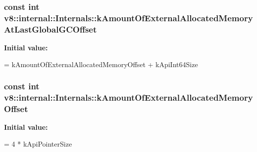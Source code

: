 \subsubsection[{\texorpdfstring{k\+Amount\+Of\+External\+Allocated\+Memory\+At\+Last\+Global\+G\+C\+Offset}{kAmountOfExternalAllocatedMemoryAtLastGlobalGCOffset}}]{\setlength{\rightskip}{0pt plus 5cm}const int v8\+::internal\+::\+Internals\+::k\+Amount\+Of\+External\+Allocated\+Memory\+At\+Last\+Global\+G\+C\+Offset\hspace{0.3cm}{\ttfamily [static]}}\hypertarget{classv8_1_1internal_1_1Internals_a4839a352b8fc929d6f05028abe0db272}{}\label{classv8_1_1internal_1_1Internals_a4839a352b8fc929d6f05028abe0db272}
{\bfseries Initial value\+:}
\begin{DoxyCode}
=
      kAmountOfExternalAllocatedMemoryOffset + kApiInt64Size
\end{DoxyCode}
\subsubsection[{\texorpdfstring{k\+Amount\+Of\+External\+Allocated\+Memory\+Offset}{kAmountOfExternalAllocatedMemoryOffset}}]{\setlength{\rightskip}{0pt plus 5cm}const int v8\+::internal\+::\+Internals\+::k\+Amount\+Of\+External\+Allocated\+Memory\+Offset\hspace{0.3cm}{\ttfamily [static]}}\hypertarget{classv8_1_1internal_1_1Internals_a715b5e2c414c5efd35c5e01d4f2b9f85}{}\label{classv8_1_1internal_1_1Internals_a715b5e2c414c5efd35c5e01d4f2b9f85}
{\bfseries Initial value\+:}
\begin{DoxyCode}
=
      4 * kApiPointerSize
\end{DoxyCode}
